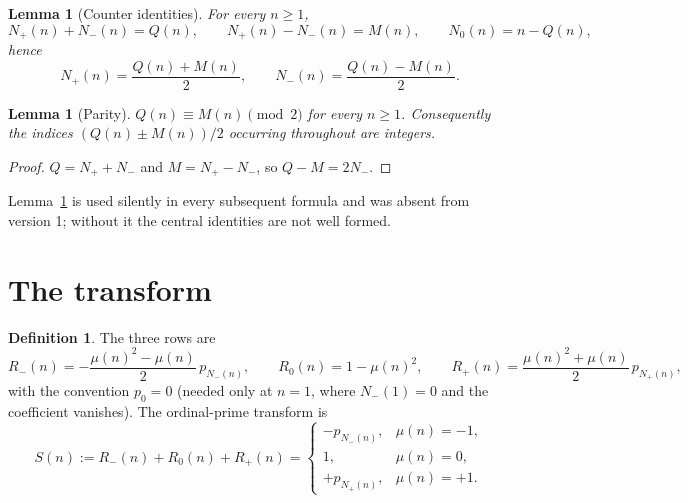 \documentclass[11pt]{amsart}
\numberwithin{equation}{section}
\theoremstyle{plain}
\newtheorem{lemma}[theorem]{Lemma}
\theoremstyle{definition}
\newtheorem{definition}[theorem]{Definition}
\theoremstyle{remark}
\newcommand{\mob}{\mu}
\newcommand{\Mert}{M}
\newcommand{\Sq}{Q}
\begin{document}
\begin{lemma}[Counter identities]\label{lem:counters}
For every $n\ge1$,
\begin{equation}
\label{eq:counter-identities}
N_+(n)+N_-(n)=\Sq(n),
\qquad
N_+(n)-N_-(n)=\Mert(n),
\qquad
N_0(n)=n-\Sq(n),
\end{equation}
hence
\begin{equation}
\label{eq:counter-solutions}
N_+(n)=\frac{\Sq(n)+\Mert(n)}2,
\qquad
N_-(n)=\frac{\Sq(n)-\Mert(n)}2 .
\end{equation}
\end{lemma}

\begin{lemma}[Parity]\label{lem:parity}
$\Sq(n)\equiv \Mert(n)\pmod 2$ for every $n\ge1$. Consequently the indices
$(\Sq(n)\pm\Mert(n))/2$ occurring throughout are integers.
\end{lemma}

\begin{proof}
$\Sq=N_++N_-$ and $\Mert=N_+-N_-$, so $\Sq-\Mert=2N_-$.
\end{proof}

Lemma~\ref{lem:parity} is used silently in every subsequent formula and was
absent from version 1; without it the central identities are not well formed.

\section{The transform}
\label{sec:transform}

\begin{definition}
\label{def:transform}
The three rows are
\begin{equation}
\label{eq:transform-rows}
R_-(n)=-\frac{\mob(n)^2-\mob(n)}2\,p_{N_-(n)},
\qquad
R_0(n)=1-\mob(n)^2,
\qquad
R_+(n)=\frac{\mob(n)^2+\mob(n)}2\,p_{N_+(n)} ,
\end{equation}
with the convention $p_0=0$ (needed only at $n=1$, where $N_-(1)=0$ and the
coefficient vanishes). The ordinal-prime transform is
\begin{equation}
\label{eq:transform-piecewise}
S(n):=R_-(n)+R_0(n)+R_+(n)
=
\begin{cases}
-p_{N_-(n)},&\mob(n)=-1,\\[1mm]
1,&\mob(n)=0,\\[1mm]
+p_{N_+(n)},&\mob(n)=+1 .
\end{cases}
\end{equation}
\end{definition}
\end{document}
